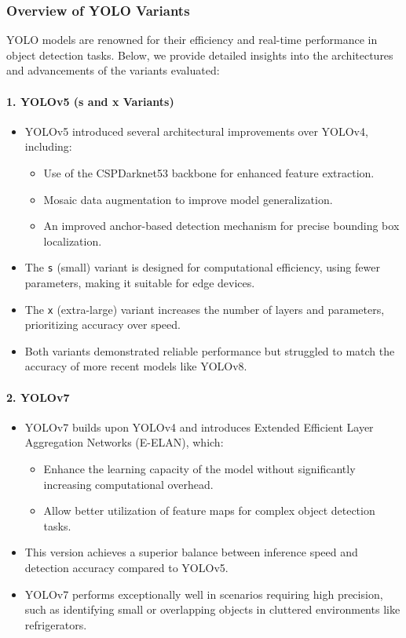 \documentclass[letterpaper,11pt]{report}
\begin{document}
\subsubsection{Overview of YOLO Variants}
YOLO models are renowned for their efficiency and real-time performance in object detection tasks. Below, we provide detailed insights into the architectures and advancements of the variants evaluated:

\paragraph{1. YOLOv5 (s and x Variants)}
\begin{itemize}
    \item YOLOv5 introduced several architectural improvements over YOLOv4, including:
          \begin{itemize}
              \item Use of the CSPDarknet53 backbone for enhanced feature extraction.
              \item Mosaic data augmentation to improve model generalization.
              \item An improved anchor-based detection mechanism for precise bounding box localization.
          \end{itemize}
    \item The \texttt{s} (small) variant is designed for computational efficiency, using fewer parameters, making it suitable for edge devices.
    \item The \texttt{x} (extra-large) variant increases the number of layers and parameters, prioritizing accuracy over speed.
    \item Both variants demonstrated reliable performance but struggled to match the accuracy of more recent models like YOLOv8.
\end{itemize}

\paragraph{2. YOLOv7}
\begin{itemize}
    \item YOLOv7 builds upon YOLOv4 and introduces Extended Efficient Layer Aggregation Networks (E-ELAN), which:
          \begin{itemize}
              \item Enhance the learning capacity of the model without significantly increasing computational overhead.
              \item Allow better utilization of feature maps for complex object detection tasks.
          \end{itemize}
    \item This version achieves a superior balance between inference speed and detection accuracy compared to YOLOv5.
    \item YOLOv7 performs exceptionally well in scenarios requiring high precision, such as identifying small or overlapping objects in cluttered environments like refrigerators.
\end{itemize}
\end{document}
